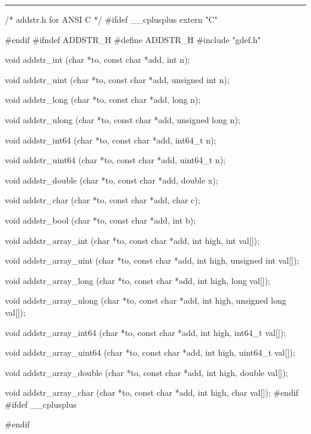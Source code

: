 \bigskip\hrule
\code\hide
/*  addstr.h  for ANSI C  */
#ifdef __cplusplus
extern "C" {
#endif
#ifndef ADDSTR_H
#define ADDSTR_H
\endhide
#include "gdef.h"
\endcode

\code

void  addstr_int (char *to, const char *add, int n);

void  addstr_uint (char *to, const char *add, unsigned int n);

void  addstr_long (char *to, const char *add, long n);

void  addstr_ulong (char *to, const char *add, unsigned long n);

void  addstr_int64 (char *to, const char *add, int64_t n);

void  addstr_uint64 (char *to, const char *add, uint64_t n);

void  addstr_double (char *to, const char *add, double x);

void  addstr_char (char *to, const char *add, char c);

void  addstr_bool (char *to, const char *add, int b);
\endcode

\code

void  addstr_array_int (char *to, const char *add, int high, int val[]);

void  addstr_array_uint (char *to, const char *add, int high,
                        unsigned int val[]);

void  addstr_array_long (char *to, const char *add, int high, long val[]);

void  addstr_array_ulong (char *to, const char *add, int high,
                         unsigned long val[]);

void  addstr_array_int64 (char *to, const char *add, int high, int64_t val[]);

void  addstr_array_uint64 (char *to, const char *add, int high, uint64_t val[]);

void  addstr_array_double (char *to, const char *add, int high, double val[]);

void  addstr_array_char (char *to, const char *add, int high, char val[]);
\hide
#endif
#ifdef __cplusplus
}
#endif
\endhide\endcode

